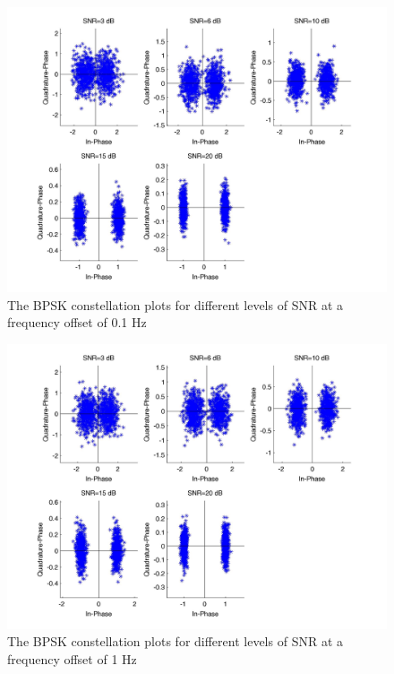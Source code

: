 \documentclass[]{article}
\begin{document}
\begin{figure}[H]
\centering
\hspace*{-2cm}\includegraphics[width=1.3\textwidth]{bpConstfo2.jpg}
\caption{The BPSK constellation plots for different levels of SNR at a frequency offset of 0.1 Hz}
\end{figure}

\begin{figure}[H]
\centering
\hspace*{-2cm}\includegraphics[width=1.3\textwidth]{bpConstfo3.jpg}
\caption{The BPSK constellation plots for different levels of SNR at a frequency offset of 1 Hz}
\end{figure}
\end{document}
